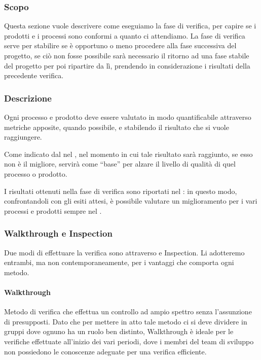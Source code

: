 		\subsubsection{Scopo}
		Questa sezione vuole descrivere come eseguiamo la fase di verifica, per capire se i prodotti e i processi sono conformi a quanto ci attendiamo.
		La fase di verifica serve per stabilire se è opportuno o meno procedere alla fase successiva del progetto, se ciò non fosse possibile sarà necessario il
		ritorno ad una fase stabile del progetto per poi ripartire da lì, prendendo in considerazione i risultati della precedente verifica.


		\subsubsection{Descrizione}
		Ogni processo e prodotto deve essere valutato in modo quantificabile attraverso metriche apposite, quando possibile, e stabilendo il risultato che si vuole
		raggiungere.

		Come indicato dal  nel \Doc{\PdQv}, nel momento in cui tale risultato sarà raggiunto, se esso non è il migliore,
		servirà come ``base'' per alzare il livello di qualità di quel processo o prodotto.

		I risultati ottenuti nella fase di verifica sono riportati nel \PdQ: in questo modo, confrontandoli con gli esiti attesi,
		è possibile valutare un miglioramento per i vari processi e prodotti sempre nel \PdQ.

		\subsubsection{Walkthrough e Inspection}
		Due modi di effettuare la verifica sono attraverso  e Inspection.
		Li adotteremo entrambi, ma non contemporaneamente, per i vantaggi che comporta ogni metodo.

			\paragraph{Walkthrough}
			Metodo di verifica che effettua un controllo ad ampio spettro senza l’assunzione di presupposti. Dato che per mettere in atto tale metodo ci
			si deve dividere in gruppi dove ognuno ha un ruolo ben distinto, Walkthrough è ideale per le verifiche effettuate all'inizio dei vari periodi,
			dove i membri del team di sviluppo non possiedono le conoscenze adeguate per una verifica efficiente.

